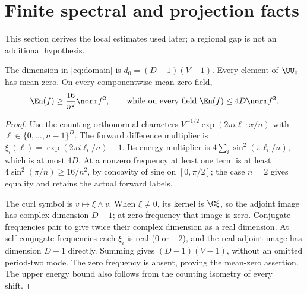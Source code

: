 \section{Finite spectral and projection facts}\label{sec:finite}
This section derives the local estimates used later; a regional gap is not
an additional hypothesis.

\begin{lemma}\label{lem:fourier}
The dimension in \eqref{eq:domain} is $d_0=(D-1)(V-1)$. Every element of
$\UU_0$ has mean zero. On every componentwise mean-zero field,
\[
 \En(f)\geq\frac{16}{n^2}\norm f^2,
 \qquad\text{while on every field }\En(f)\leq4D\norm f^2.
\]
\end{lemma}
\begin{proof}
Use the counting-orthonormal characters
$V^{-1/2}\exp(2\pi i\ell\cdot x/n)$ with
$\ell\in\{0,\ldots,n-1\}^D$. The forward difference multiplier is
$\xi_i(\ell)=\exp(2\pi i\ell_i/n)-1$. Its energy multiplier is
$4\sum_i\sin^2(\pi\ell_i/n)$, which is at most $4D$.
At a nonzero frequency at least one term is at least
$4\sin^2(\pi/n)\geq16/n^2$, by concavity of sine on $[0,\pi/2]$;
the case $n=2$ gives equality and retains the actual forward labels.

The curl symbol is $v\mapsto\xi\wedge v$. When $\xi\ne0$, its kernel is
$\C\xi$, so the adjoint image has complex dimension $D-1$; at zero frequency
that image is zero. Conjugate frequencies pair to give twice their complex
dimension as a real dimension. At self-conjugate frequencies each $\xi_i$ is
real ($0$ or $-2$), and the real adjoint image has dimension $D-1$ directly.
Summing gives $(D-1)(V-1)$, without an omitted period-two mode. The zero
frequency is absent, proving the mean-zero assertion. The upper energy bound
also follows from the counting isometry of every shift.
\end{proof}

